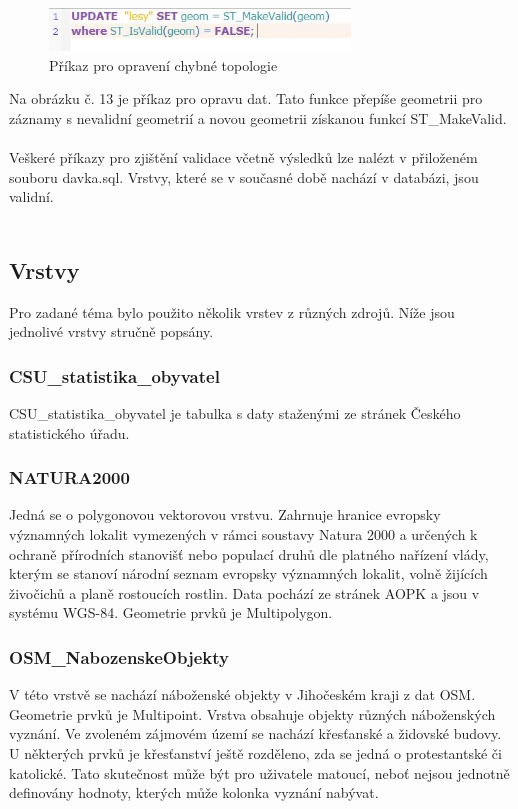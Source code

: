 \documentclass[a4paper, 12pt]{article}
\begin{document}
\begin{figure}[h!]
	\centering
	\includegraphics[width=8cm]{pictures/oprava_val.jpg}
	\caption{Příkaz pro opravení chybné topologie}
\end{figure}

Na obrázku č. 13 je příkaz pro opravu dat. Tato funkce přepíše geometrii pro záznamy s nevalidní geometrií a novou geometrii získanou funkcí ST\_MakeValid.\\
\\

Veškeré příkazy pro zjištění validace včetně výsledků lze nalézt v přiloženém souboru davka.sql. Vrstvy, které se v současné době nachází v databázi, jsou validní.\\
\\
\clearpage
\subsection{Vrstvy}
Pro zadané téma bylo použito několik vrstev z různých zdrojů. Níže jsou jednolivé vrstvy stručně popsány.

\subsubsection{CSU\_statistika\_obyvatel}
CSU\_statistika\_obyvatel je tabulka s daty staženými ze stránek Českého statistického úřadu. 

\subsubsection{NATURA2000}
Jedná se o polygonovou vektorovou vrstvu. Zahrnuje hranice evropsky významných lokalit vymezených v rámci soustavy Natura 2000 a určených k ochraně přírodních stanovišť nebo populací druhů dle platného nařízení vlády, kterým se stanoví národní seznam evropsky významných lokalit, volně žijících živočichů a planě rostoucích rostlin. Data pochází ze stránek AOPK a jsou v systému WGS-84. Geometrie prvků je Multipolygon.

\subsubsection{OSM\_NabozenskeObjekty}
V této vrstvě se nachází náboženské objekty v Jihočeském kraji z dat OSM. Geometrie prvků je Multipoint. Vrstva obsahuje objekty různých náboženských vyznání. Ve zvoleném zájmovém území se nachází křesťanské a židovské budovy. U některých prvků je křesťanství ještě rozděleno, zda se jedná o protestantské či katolické. Tato skutečnost může být pro uživatele matoucí, neboť nejsou jednotně definovány hodnoty, kterých může kolonka vyznání nabývat.
\end{document}

